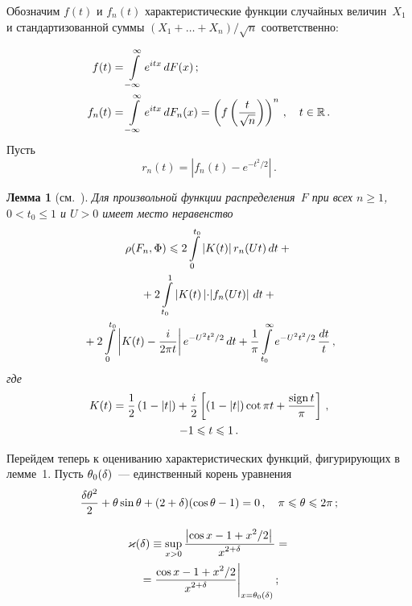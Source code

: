 \begin{multicols}{2}
{}

\medskip

Обозначим $f(t)$ и $f_n(t)$ характеристические функции случайных
величин~$X_1$ и стандартизованной суммы $(X_1+\ldots+X_n)/\sqrt{n}$
соответственно:

\noindent
\begin{align*}
f(t)&=\int\limits_{-\infty}^\infty e^{itx}\,dF(x)\,;\\
f_n(t)&=\int\limits_{-\infty}^{\infty}e^{itx}\,dF_n(x)=
\left(f\left(\displaystyle\frac{\displaystyle t\mathstrut}{\displaystyle \sqrt n\mathstrut}\right)\right)^n\,,\quad t\in\mathbb R\,.
\end{align*}
Пусть
$$
r_n(t)=\left|f_n(t)-e^{-t^2/2}\right|\,.
$$

\medskip

\noindent
\textbf{Лемма 1} (см.~\cite{Prawitz1972}). %
\textit{Для произвольной функции распределения~$F$ при всех $n\ge1$,
$0<t_0\le1$ и $U>0$ имеет место неравенство}
\begin{multline*}
\rho(F_n,\Phi)\leqslant 2\int\limits_0^{t_0}\left|K(t)\right|r_n(Ut)\,dt+{}\\
{}+
2\int\limits_{t_0}^{1}|K(t)\left|\cdot|f_n(Ut)\right|\,dt+{}\\
{}+
2\int\limits_0^{t_0}\left|K(t)-\displaystyle\frac{\displaystyle i\mathstrut}{\displaystyle 2\pi t\mathstrut}\right|e^{-U^2t^2/2}\,dt +
\displaystyle\frac{\displaystyle 1\mathstrut}{\displaystyle \pi\mathstrut}\int\limits_{t_0}^\infty e^{-U^2t^2/2}\,\displaystyle\frac{\displaystyle dt\mathstrut}{\displaystyle t\mathstrut}\,,\hspace*{-0.98pt}
\end{multline*}
\textit{где}
\begin{multline*}
K(t)=\fr{1}{2}\left(1-|t|\right)+\fr {i}{2}\left[(1-|t|)\cot\pi
t+\frac{\sign t}\pi\right]\,,\\
-1\le t\le1\,. %
\end{multline*}

\smallskip

Перейдем теперь к оцениванию характеристических функций,
фигурирующих в лемме~1. Пусть
$\theta_0(\delta)$~--- единственный корень уравнения
$$
\displaystyle\frac{\displaystyle \delta\theta^2\mathstrut}{\displaystyle 2\mathstrut}+ \theta\sin \theta + (2+\delta)(\cos \theta - 1)=0\,,
\quad \pi\leqslant\theta\leqslant2\pi\,;
$$

\vspace*{-12pt}

\noindent
\begin{multline*}
\varkappa(\delta) \equiv \sup_{x>0}\displaystyle\frac{\displaystyle \left|\cos
x-1+x^2/2\right|\mathstrut}{\displaystyle x^{2+\delta}\mathstrut}={}\\
{}=\displaystyle\frac{\displaystyle \cos
x-1+x^2/2\mathstrut}{\displaystyle x^{2+\delta}\mathstrut}\Bigg|_{x=\theta_0(\delta)}\,;
\end{multline*}

\vspace*{-12pt}


\end{multicols}

